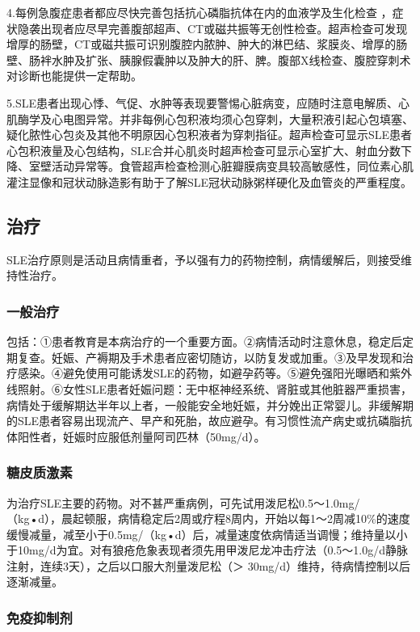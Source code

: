 4.每例急腹症患者都应尽快完善包括抗心磷脂抗体在内的血液学及生化检查
，症状隐袭出现者应尽早完善腹部超声、CT或磁共振等无创性检查。超声检查可发现增厚的肠壁，CT或磁共振可识别腹腔内脓肿、肿大的淋巴结、浆膜炎、增厚的肠壁、肠袢水肿及扩张、胰腺假囊肿以及肿大的肝、脾。腹部X线检查、腹腔穿刺术对诊断也能提供一定帮助。

5.SLE患者出现心悸、气促、水肿等表现要警惕心脏病变，应随时注意电解质、心肌酶学及心电图异常。并非每例心包积液均须心包穿刺，大量积液引起心包填塞、疑化脓性心包炎及其他不明原因心包积液者为穿刺指征。超声检查可显示SLE患者心包积液量及心包结构，SLE合并心肌炎时超声检查可显示心室扩大、射血分数下降、室壁活动异常等。食管超声检查检测心脏瓣膜病变具较高敏感性，同位素心肌灌注显像和冠状动脉造影有助于了解SLE冠状动脉粥样硬化及血管炎的严重程度。

\subsection{治疗}

SLE治疗原则是活动且病情重者，予以强有力的药物控制，病情缓解后，则接受维持性治疗。

\subsubsection{一般治疗}

包括：①患者教育是本病治疗的一个重要方面。②病情活动时注意休息，稳定后定期复查。妊娠、产褥期及手术患者应密切随访，以防复发或加重。③及早发现和治疗感染。④避免使用可能诱发SLE的药物，如避孕药等。⑤避免强阳光曝晒和紫外线照射。⑥女性SLE患者妊娠问题：无中枢神经系统、肾脏或其他脏器严重损害，病情处于缓解期达半年以上者，一般能安全地妊娠，并分娩出正常婴儿。非缓解期的SLE患者容易出现流产、早产和死胎，故应避孕。有习惯性流产病史或抗磷脂抗体阳性者，妊娠时应服低剂量阿司匹林（50mg/d）。

\subsubsection{糖皮质激素}

为治疗SLE主要的药物。对不甚严重病例，可先试用泼尼松0.5～1.0mg/（kg•d），晨起顿服，病情稳定后2周或疗程8周内，开始以每1～2周减10\%的速度缓慢减量，减至小于0.5mg/（kg•d）后，减量速度依病情适当调慢；维持量以小于10mg/d为宜。对有狼疮危象表现者须先用甲泼尼龙冲击疗法（0.5～1.0g/d静脉注射，连续3天），之后以口服大剂量泼尼松（＞
30mg/d）维持，待病情控制以后逐渐减量。

\subsubsection{免疫抑制剂}

